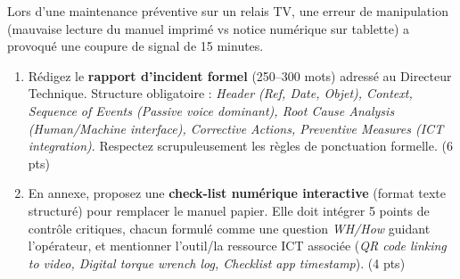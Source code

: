\documentclass[11pt]{article}
\begin{document}
\begin{exercice}
Lors d'une maintenance préventive sur un relais TV, une erreur de manipulation (mauvaise lecture du manuel imprimé vs notice numérique sur tablette) a provoqué une coupure de signal de 15 minutes.

\begin{enumerate}
    \item Rédigez le \textbf{rapport d'incident formel} (250--300 mots) adressé au Directeur Technique. Structure obligatoire : \textit{Header (Ref, Date, Objet), Context, Sequence of Events (Passive voice dominant), Root Cause Analysis (Human/Machine interface), Corrective Actions, Preventive Measures (ICT integration)}. Respectez scrupuleusement les règles de ponctuation formelle. (6 pts)
    \item En annexe, proposez une \textbf{check-list numérique interactive} (format texte structuré) pour remplacer le manuel papier. Elle doit intégrer 5 points de contrôle critiques, chacun formulé comme une question \textit{WH/How} guidant l'opérateur, et mentionner l'outil/la ressource ICT associée (\textit{QR code linking to video, Digital torque wrench log, Checklist app timestamp}). (4 pts)
\end{enumerate}
\end{exercice}
\end{document}
